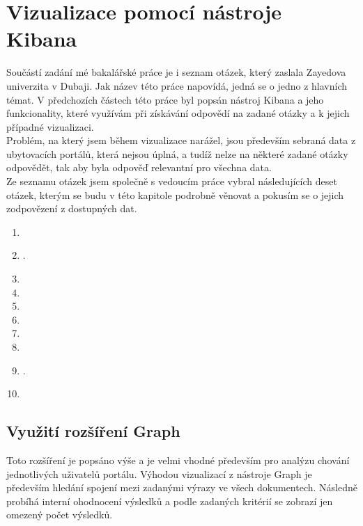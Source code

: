 \documentclass[czech,BP]{thesiskiv}
\begin{document}
\chapter{Vizualizace pomocí nástroje Kibana}
\label{Vizualizace}
Součástí zadání mé bakalářské práce je i seznam otázek, který zaslala Zayedova univerzita v Dubaji. Jak název této práce napovídá, jedná se o jedno z hlavních témat. V předchozích částech této práce byl popsán nástroj Kibana a jeho funkcionality, které využívám při získávání odpovědí na zadané otázky a k jejich případné vizualizaci.
\\
Problém, na který jsem během vizualizace narážel, jsou především sebraná data z ubytovacích portálů, která nejsou úplná, a tudíž nelze na některé zadané otázky odpovědět, tak aby byla odpověď relevantní pro všechna data.
\\
Ze seznamu otázek jsem společně s vedoucím práce vybral následujících deset otázek, kterým se budu v této kapitole podrobně věnovat a pokusím se o jejich zodpovězení z dostupných dat.
\begin{enumerate}
	\item {}
	\item {}.
	\item {}
	\item {}
	\item {}
	\item {}
	\item {}
	\item {}
	\item {}.
	\item {}
\end{enumerate}
\newpage
\section{Využití rozšíření Graph}
Toto rozšíření je popsáno výše a je velmi vhodné především pro analýzu chování jednotlivých uživatelů portálu. Výhodou vizualizací z nástroje Graph je především hledání spojení mezi zadanými výrazy ve všech dokumentech. Následně probíhá interní ohodnocení výsledků a podle zadaných kritérií se zobrazí jen omezený počet výsledků.
\end{document}
